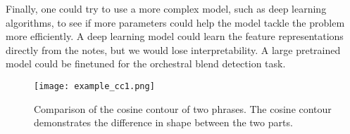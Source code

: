 \documentclass{article}
\begin{document}
Finally, one could try to use a more complex model, such as deep learning algorithms, to see if more parameters could help the model tackle the problem more efficiently.
A deep learning model could learn the feature representations directly from the notes, but we would lose interpretability. A large pretrained model could be finetuned for the orchestral blend detection task.







\begin{figure}[H]
  \centering
  \texttt{[image: example\_cc1.png]}
  \caption{Comparison of the cosine contour of two phrases.
  The cosine contour demonstrates the difference in shape between the two parts.}
  \label{fig:cosine_contour_comparison}
\end{figure}


%
%
%
%
%
\end{document}
